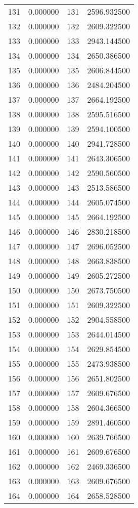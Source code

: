 \documentclass[12pt]{article}
\begin{document}
\begin{longtable}{@{}cccc@{}}
131 & 0.000000 & 131 & 2596.932500 \\
132 & 0.000000 & 132 & 2609.322500 \\
133 & 0.000000 & 133 & 2943.144500 \\
134 & 0.000000 & 134 & 2650.386500 \\
135 & 0.000000 & 135 & 2606.844500 \\
136 & 0.000000 & 136 & 2484.204500 \\
137 & 0.000000 & 137 & 2664.192500 \\
138 & 0.000000 & 138 & 2595.516500 \\
139 & 0.000000 & 139 & 2594.100500 \\
140 & 0.000000 & 140 & 2941.728500 \\
141 & 0.000000 & 141 & 2643.306500 \\
142 & 0.000000 & 142 & 2590.560500 \\
143 & 0.000000 & 143 & 2513.586500 \\
144 & 0.000000 & 144 & 2605.074500 \\
145 & 0.000000 & 145 & 2664.192500 \\
146 & 0.000000 & 146 & 2830.218500 \\
147 & 0.000000 & 147 & 2696.052500 \\
148 & 0.000000 & 148 & 2663.838500 \\
149 & 0.000000 & 149 & 2605.272500 \\
150 & 0.000000 & 150 & 2673.750500 \\
151 & 0.000000 & 151 & 2609.322500 \\
152 & 0.000000 & 152 & 2904.558500 \\
153 & 0.000000 & 153 & 2644.014500 \\
154 & 0.000000 & 154 & 2629.854500 \\
155 & 0.000000 & 155 & 2473.938500 \\
156 & 0.000000 & 156 & 2651.802500 \\
157 & 0.000000 & 157 & 2609.676500 \\
158 & 0.000000 & 158 & 2604.366500 \\
159 & 0.000000 & 159 & 2891.460500 \\
160 & 0.000000 & 160 & 2639.766500 \\
161 & 0.000000 & 161 & 2609.676500 \\
162 & 0.000000 & 162 & 2469.336500 \\
163 & 0.000000 & 163 & 2609.676500 \\
164 & 0.000000 & 164 & 2658.528500 \\

\end{longtable}
\end{document}
